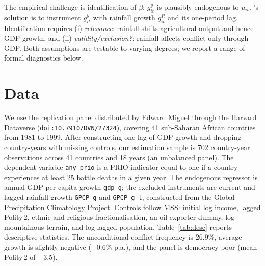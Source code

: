 \documentclass[11pt,a4paper]{article}
\begin{document}
The empirical challenge is identification of $\beta$: $g^{y}_{it}$
is plausibly endogenous to $u_{it}$. \citet{MSS2004}'s solution is
to instrument $g^{y}_{it}$ with rainfall growth $g^{R}_{it}$ and its
one-period lag. Identification requires (i) \emph{relevance}:
rainfall shifts agricultural output and hence GDP growth, and
(ii) \emph{validity/exclusion?}: rainfall affects conflict only through GDP.
Both assumptions are testable to varying degrees; we report a range
of formal diagnostics below.

\section{Data}\label{sec:data}
We use the replication panel distributed by Edward Miguel through the
Harvard Dataverse (\texttt{doi:10.7910/DVN/27324}), covering 41
sub-Saharan African countries from 1981 to 1999. After constructing
one lag of GDP growth and dropping country-years with missing
controls, our estimation sample is 702 country-year observations
across 41 countries and 18 years (an unbalanced panel). The dependent
variable \texttt{any\_prio} is a PRIO indicator equal to one if a
country experiences at least 25 battle deaths in a given year. The
endogenous regressor is annual GDP-per-capita growth \texttt{gdp\_g};
the excluded instruments are current and lagged rainfall growth
\texttt{GPCP\_g} and \texttt{GPCP\_g\_l}, constructed from the Global
Precipitation Climatology Project. Controls follow MSS: initial log
income, lagged Polity\,2, ethnic and religious fractionalisation, an
oil-exporter dummy, log mountainous terrain, and log lagged
population. Table~\ref{tab:desc} reports descriptive statistics. The
unconditional conflict frequency is 26.9\%, average growth is
slightly negative ($-0.6\%$ p.a.), and the panel is democracy-poor
(mean Polity\,2 of $-3.5$).
\end{document}
